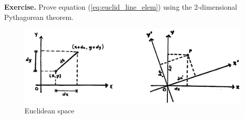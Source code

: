 \par\vspace{\baselineskip}

{\bf Exercise.} Prove equation (\ref{eq:euclid_line_elem}) using the 2-dimensional Pythagorean theorem.

\par\vspace{\baselineskip}
\begin{figure}[ht]
\begin{center}
\includegraphics[scale=0.6]{Draw/lec2_6.png}
\end{center}
\caption{Euclidean space}
\label{fig:lec2_6}
\end{figure}


